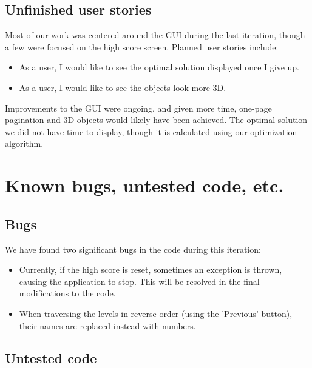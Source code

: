 \documentclass[11pt]{article}
\begin{document}
\subsection{Unfinished user stories}

Most of our work was centered around the GUI during the last iteration, though a
few were focused on the high score screen.  Planned user stories include:

\begin{itemize}

    \item As a user, I would like to see the optimal solution displayed once I
    give up.

    \item As a user, I would like to see the objects look more 3D.

\end{itemize}

Improvements to the GUI were ongoing, and given more time, one-page pagination
and 3D objects would likely have been achieved.  The optimal solution we did not
have time to display, though it is calculated using our optimization algorithm.

\section{Known bugs, untested code, etc.}

\subsection{Bugs}

We have found two significant bugs in the code during this iteration:

\begin{itemize}

    \item Currently, if the high score is reset, sometimes an exception is
    thrown, causing the application to stop.  This will be resolved in the final
    modifications to the code.

    \item When traversing the levels in reverse order (using the 'Previous'
    button), their names are replaced instead with numbers.

\end{itemize}

\subsection{Untested code}
\end{document}
